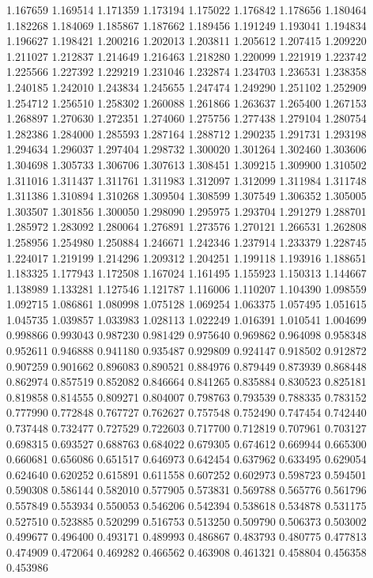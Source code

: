 1.167659
1.169514
1.171359
1.173194
1.175022
1.176842
1.178656
1.180464
1.182268
1.184069
1.185867
1.187662
1.189456
1.191249
1.193041
1.194834
1.196627
1.198421
1.200216
1.202013
1.203811
1.205612
1.207415
1.209220
1.211027
1.212837
1.214649
1.216463
1.218280
1.220099
1.221919
1.223742
1.225566
1.227392
1.229219
1.231046
1.232874
1.234703
1.236531
1.238358
1.240185
1.242010
1.243834
1.245655
1.247474
1.249290
1.251102
1.252909
1.254712
1.256510
1.258302
1.260088
1.261866
1.263637
1.265400
1.267153
1.268897
1.270630
1.272351
1.274060
1.275756
1.277438
1.279104
1.280754
1.282386
1.284000
1.285593
1.287164
1.288712
1.290235
1.291731
1.293198
1.294634
1.296037
1.297404
1.298732
1.300020
1.301264
1.302460
1.303606
1.304698
1.305733
1.306706
1.307613
1.308451
1.309215
1.309900
1.310502
1.311016
1.311437
1.311761
1.311983
1.312097
1.312099
1.311984
1.311748
1.311386
1.310894
1.310268
1.309504
1.308599
1.307549
1.306352
1.305005
1.303507
1.301856
1.300050
1.298090
1.295975
1.293704
1.291279
1.288701
1.285972
1.283092
1.280064
1.276891
1.273576
1.270121
1.266531
1.262808
1.258956
1.254980
1.250884
1.246671
1.242346
1.237914
1.233379
1.228745
1.224017
1.219199
1.214296
1.209312
1.204251
1.199118
1.193916
1.188651
1.183325
1.177943
1.172508
1.167024
1.161495
1.155923
1.150313
1.144667
1.138989
1.133281
1.127546
1.121787
1.116006
1.110207
1.104390
1.098559
1.092715
1.086861
1.080998
1.075128
1.069254
1.063375
1.057495
1.051615
1.045735
1.039857
1.033983
1.028113
1.022249
1.016391
1.010541
1.004699
0.998866
0.993043
0.987230
0.981429
0.975640
0.969862
0.964098
0.958348
0.952611
0.946888
0.941180
0.935487
0.929809
0.924147
0.918502
0.912872
0.907259
0.901662
0.896083
0.890521
0.884976
0.879449
0.873939
0.868448
0.862974
0.857519
0.852082
0.846664
0.841265
0.835884
0.830523
0.825181
0.819858
0.814555
0.809271
0.804007
0.798763
0.793539
0.788335
0.783152
0.777990
0.772848
0.767727
0.762627
0.757548
0.752490
0.747454
0.742440
0.737448
0.732477
0.727529
0.722603
0.717700
0.712819
0.707961
0.703127
0.698315
0.693527
0.688763
0.684022
0.679305
0.674612
0.669944
0.665300
0.660681
0.656086
0.651517
0.646973
0.642454
0.637962
0.633495
0.629054
0.624640
0.620252
0.615891
0.611558
0.607252
0.602973
0.598723
0.594501
0.590308
0.586144
0.582010
0.577905
0.573831
0.569788
0.565776
0.561796
0.557849
0.553934
0.550053
0.546206
0.542394
0.538618
0.534878
0.531175
0.527510
0.523885
0.520299
0.516753
0.513250
0.509790
0.506373
0.503002
0.499677
0.496400
0.493171
0.489993
0.486867
0.483793
0.480775
0.477813
0.474909
0.472064
0.469282
0.466562
0.463908
0.461321
0.458804
0.456358
0.453986
